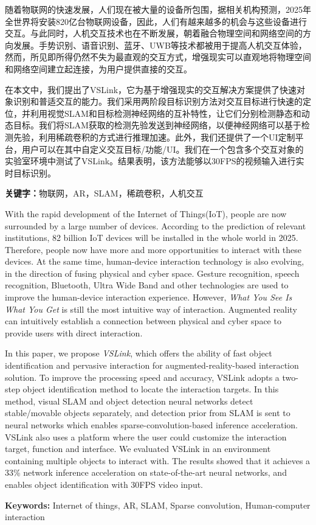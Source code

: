 \cleardoublepage
{}
随着物联网的快速发展，人们现在被大量的设备所包围，据相关机构预测，2025年全世界将安装820亿台物联网设备，因此，人们有越来越多的机会与这些设备进行交互。与此同时，人机交互技术也在不断发展，朝着融合物理空间和网络空间的方向发展。手势识别、语音识别、蓝牙、UWB等技术都被用于提高人机交互体验，然而，所见即所得仍然不失为最直观的交互方式，增强现实可以直观地将物理空间和网络空间建立起连接，为用户提供直接的交互。

在本文中，我们提出了VSLink，它为基于增强现实的交互解决方案提供了快速对象识别和普适交互的能力。我们采用两阶段目标识别方法对交互目标进行快速的定位，并利用视觉SLAM和目标检测神经网络的互补特性，让它们分别检测静态和动态目标。我们将SLAM获取的检测先验发送到神经网络，以便神经网络可以基于检测先验，利用稀疏卷积的方式进行推理加速。此外，我们还提供了一个UI定制平台，用户可以在其中自定义交互目标/功能/UI。我们在一个包含多个交互对象的实验室环境中测试了VSLink。结果表明，该方法能够以30FPS的视频输入进行实时目标识别。

\noindent\textbf{关键字：}物联网，AR，SLAM，稀疏卷积，人机交互

\cleardoublepage
{}
With the rapid development of the Internet of Things(IoT), people are now surrounded by a large number of devices. According to the prediction of relevant institutions, 82 billion IoT devices will be installed in the whole world in 2025. Therefore, people now have more and more opportunities to interact with these devices. At the same time, human-device interaction technology is also evolving, in the direction of fusing physical and cyber space. Gesture recognition, speech recognition, Bluetooth, Ultra Wide Band and other technologies are used to improve the human-device interaction experience. However, \textit{What You See Is What You Get} is still the most intuitive way of interaction. Augmented reality can intuitively establish a connection between physical and cyber space to provide users with direct interaction. 

In this paper, we propose \textit{VSLink}, which offers the ability of fast object identification and pervasive interaction for augmented-reality-based interaction solution.
To improve the processing speed and accuracy, VSLink adopts a two-step object identification method to locate the interaction targets.
In this method, visual SLAM and object detection neural networks detect stable/movable objects separately, and detection prior from SLAM is sent to neural networks which enables sparse-convolution-based inference acceleration.
VSLink also uses a platform where the user could customize the interaction target, function and interface.
We evaluated VSLink in an environment containing multiple objects to interact with. 
The results showed that it achieves a 33\% network inference acceleration on state-of-the-art neural networks, and enables object identification with 30FPS video input.

\noindent\textbf{Keywords:} Internet of things, AR, SLAM, Sparse convolution, Human-computer interaction